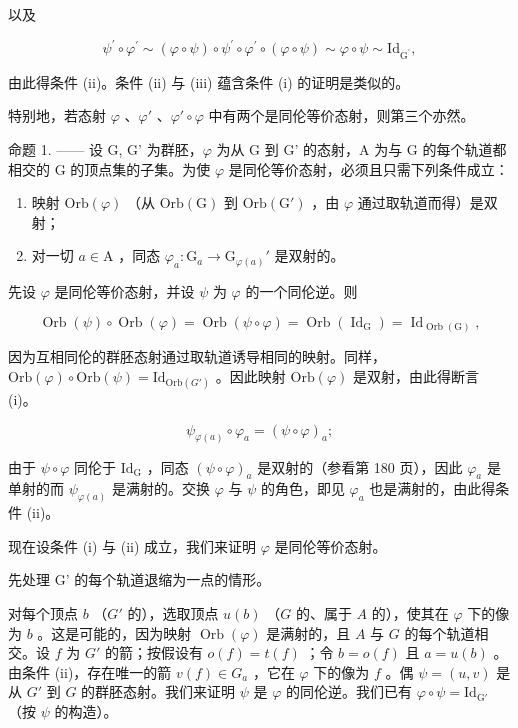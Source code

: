 以及

\[
\psi^ {\prime} \circ \varphi^ {\prime} \sim (\varphi \circ \psi) \circ \psi^ {\prime} \circ \varphi^ {\prime} \circ (\varphi \circ \psi) \sim \varphi \circ \psi \sim \mathrm{Id} _ {\mathrm{G} ^ {\prime}},
\]

由此得条件 (ii)。条件 (ii) 与 (iii) 蕴含条件 (i) 的证明是类似的。

特别地，若态射 \(\varphi\) 、\(\varphi'\) 、\(\varphi'\circ\varphi\) 中有两个是同伦等价态射，则第三个亦然。

命题 1. —— 设 G, G' 为群胚，\(\varphi\) 为从 G 到 G' 的态射，A 为与 G 的每个轨道都相交的 G 的顶点集的子集。为使 \(\varphi\) 是同伦等价态射，必须且只需下列条件成立：

\begin{enumerate}
\def\labelenumi{(\roman{enumi})}
\item
  映射 \(\mathrm{Orb}(\varphi)\) （从 \(\mathrm{Orb}(\mathrm{G})\) 到 \(\mathrm{Orb}(\mathrm{G}')\) ，由 \(\varphi\) 通过取轨道而得）是双射；
\item
  对一切 \(a \in \mathrm{A}\) ，同态 \(\varphi_a \colon \mathrm{G}_a \to \mathrm{G}_{\varphi(a)}'\) 是双射的。
\end{enumerate}

先设 \(\varphi\) 是同伦等价态射，并设 \(\psi\) 为 \(\varphi\) 的一个同伦逆。则

\[
\operatorname{Orb} (\psi) \circ \operatorname{Orb} (\varphi) = \operatorname{Orb} (\psi \circ \varphi) = \operatorname{Orb} (\operatorname{Id} _ {\mathrm{G}}) = \operatorname{Id} _ {\operatorname{Orb} (\mathrm{G})},
\]

因为互相同伦的群胚态射通过取轨道诱导相同的映射。同样，\(\mathrm{Orb}(\varphi) \circ \mathrm{Orb}(\psi) = \mathrm{Id}_{\mathrm{Orb}(G')}\) 。因此映射 \(\mathrm{Orb}(\varphi)\) 是双射，由此得断言 (i)。

\[
\psi_ {\varphi (a)} \circ \varphi_ {a} = (\psi \circ \varphi) _ {a};
\]

由于 \(\psi \circ \varphi\) 同伦于 \(\mathrm{Id}_{\mathrm{G}}\) ，同态 \((\psi \circ \varphi)_a\) 是双射的（参看第 180 页），因此 \(\varphi_a\) 是单射的而 \(\psi_{\varphi(a)}\) 是满射的。交换 \(\varphi\) 与 \(\psi\) 的角色，即见 \(\varphi_a\) 也是满射的，由此得条件 (ii)。

现在设条件 (i) 与 (ii) 成立，我们来证明 \(\varphi\) 是同伦等价态射。

先处理 G' 的每个轨道退缩为一点的情形。

对每个顶点 \(b\) （\(G'\) 的），选取顶点 \(u(b)\) （\(G\) 的、属于 \(A\) 的），使其在 \(\varphi\) 下的像为 \(b\) 。这是可能的，因为映射 \(\operatorname{Orb}(\varphi)\) 是满射的，且 \(A\) 与 \(G\) 的每个轨道相交。设 \(f\) 为 \(G'\) 的箭；按假设有 \(o(f) = t(f)\) ；令 \(b = o(f)\) 且 \(a = u(b)\) 。由条件 (ii)，存在唯一的箭 \(v(f) \in G_a\) ，它在 \(\varphi\) 下的像为 \(f\) 。偶 \(\psi = (u, v)\) 是从 \(G'\) 到 \(G\) 的群胚态射。我们来证明 \(\psi\) 是 \(\varphi\) 的同伦逆。我们已有 \(\varphi \circ \psi = \mathrm{Id}_{\mathrm{G}'}\) （按 \(\psi\) 的构造）。


